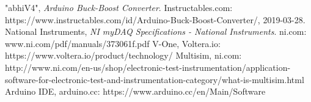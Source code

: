 \begin{thebibliography}{1}
"abhiV4", \emph{Arduino Buck-Boost Converter}. Instructables.com: https://www.instructables.com/id/Arduino-Buck-Boost-Converter/, 2019-03-28.
National Instruments, \emph{NI myDAQ Specifications - National Instruments}. ni.com: www.ni.com/pdf/manuals/373061f.pdf
V-One, Voltera.io: https://www.voltera.io/product/technology/
Multisim, ni.com: http://www.ni.com/en-us/shop/electronic-test-instrumentation/application-software-for-electronic-test-and-instrumentation-category/what-is-multisim.html
Arduino IDE, arduino.cc: https://www.arduino.cc/en/Main/Software
\end{thebibliography}
